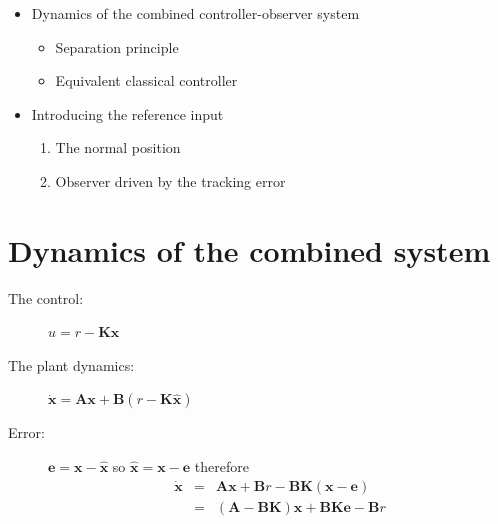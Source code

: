 \def\FileDate{10/04/02}
\def\FileVersion{1.0}


\ifslidesonly
\begin{slide}
   
\end{slide}
\fi

\ifslidesonly
\begin{slide}
   \begin{itemize}
   	\item Dynamics of the combined controller-observer system
\begin{itemize}
	\item Separation principle
	\item Equivalent classical controller
\end{itemize}
\item Introducing the reference input
\begin{enumerate}
	\item The normal position
	\item Observer driven by the tracking error
\end{enumerate}
   \end{itemize}
\end{slide}
\fi

\section*{Dynamics of the combined system} %
\label{sub:dynamics_of_the_combined_system}


 
\begin{description}
	\item[The control:] $u=r-\mathbf{K}\hat{\mathbf{x}}$
	\item[The plant dynamics:] $\dot{\mathbf{x}}=\mathbf{A}\mathbf{x}+\mathbf{B}(r-\mathbf{K}\hat{\mathbf{x}})$
	\item[Error:] $\mathbf{e}=\mathbf{x}-\hat{\mathbf{x}}$ so $\hat{\mathbf{x}}=\mathbf{x}-\mathbf{e}$ therefore
	\begin{eqnarray*}
			\dot{\mathbf{x}} & = & \mathbf{A}\mathbf{x}+\mathbf{B}r-\mathbf{BK}(\mathbf{x}-\mathbf{e}) \\
			                 & = & (\mathbf{A}-\mathbf{BK})\mathbf{x}+\mathbf{BK}\mathbf{e}-\mathbf{B}r
	\end{eqnarray*}
\end{description}

